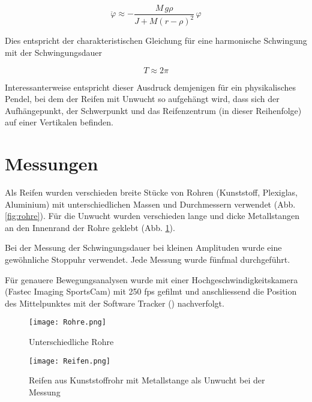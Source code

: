 \documentclass[11pt,a4paper]{article} %
\begin{document}
\begin{equation}\label{eq:chareq}
\ddot\varphi \approx -\frac{M\,g\rho}{J+M(r-\rho)^2}\,\varphi
\end{equation}

Dies entspricht der charakteristischen Gleichung für eine harmonische Schwingung mit der Schwingungsdauer

\begin{equation}\label{eq:T}
T\approx2\pi
\end{equation}

Interessanterweise entspricht dieser Ausdruck demjenigen für ein physikalisches Pendel, bei dem der Reifen mit Unwucht so aufgehängt wird, dass sich der Aufhängepunkt, der Schwerpunkt und das Reifenzentrum (in dieser Reihenfolge) auf einer Vertikalen befinden.

\section{Messungen}

Als Reifen wurden verschieden breite Stücke von Rohren (Kunststoff, Plexiglas, Aluminium) mit unterschiedlichen Massen und Durchmessern verwendet (Abb. \ref{fig:rohre}). Für die Unwucht wurden verschieden lange und dicke Metallstangen an den Innenrand der Rohre geklebt (Abb. \ref{fig:reifen}). 

Bei der Messung der Schwingungsdauer bei kleinen Amplituden wurde eine gewöhnliche Stoppuhr verwendet. Jede Messung wurde fünfmal durchgeführt.

Für genauere Bewegungsanalysen wurde mit einer Hochgeschwindigkeitskamera (Fastec Imaging SportsCam) mit 250 fps gefilmt und anschliessend die Position des Mittelpunktes mit der Software Tracker (\cite{Tracker}) nachverfolgt.

\begin{figure}[H]

\begin{minipage}{0.45\linewidth}
\texttt{[image: Rohre.png]}
\caption{Unterschiedliche Rohre}
\label{fig:rohre}
\end{minipage}
\quad
\begin{minipage}{0.45\linewidth}
\texttt{[image: Reifen.png]}
\caption{Reifen aus Kunststoffrohr mit Metallstange als Unwucht bei der Messung}
\label{fig:reifen}
\end{minipage}

\end{figure}
\end{document}
